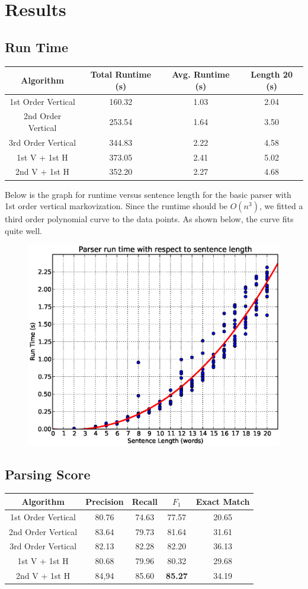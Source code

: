 \documentclass[12pt]{article}
\begin{document}
\section{Results}
\subsection{Run Time}
\begin{center}
\begin{tabular}{|c|c|c|c|}
\hline
Algorithm & Total Runtime (s) & Avg. Runtime (s) & Length 20 (s)\\\hline
1st Order Vertical & 160.32 & 1.03 & 2.04 \\\hline
2nd Order Vertical & 253.54 & 1.64 & 3.50 \\\hline
3rd Order Vertical & 344.83  & 2.22 & 4.58 \\\hline
1st V + 1st H & 373.05 & 2.41 & 5.02 \\\hline
2nd V + 1st H & 352.20 & 2.27 & 4.68 \\\hline
\end{tabular}
\end{center}
Below is the graph for runtime versus sentence length for the basic parser with 1st order vertical markovization. Since the runtime should be $O(n^3)$, we fitted a third order polynomial curve to the data points. As shown below, the curve fits quite well.
\begin{figure}[H]
\centering
\includegraphics[width=0.5\linewidth]{./stats/runtime}
\end{figure}
\subsection{Parsing Score}
\begin{center}
\begin{tabular}{|c|c|c|c|c|}
\hline
Algorithm & Precision & Recall & $F_1$ & Exact Match \\\hline
1st Order Vertical & 80.76 & 74.63 & 77.57 & 20.65\\\hline
2nd Order Vertical & 83.64 & 79.73 & 81.64 & 31.61 \\\hline
3rd Order Vertical & 82.13 & 82.28 & 82.20 & 36.13 \\\hline
1st V + 1st H & 80.68 & 79.96 & 80.32 & 29.68 \\\hline
2nd V + 1st H & 84,94 & 85.60 & \textbf{85.27} & 34.19 \\\hline
\end{tabular}
\end{center}
\end{document}
